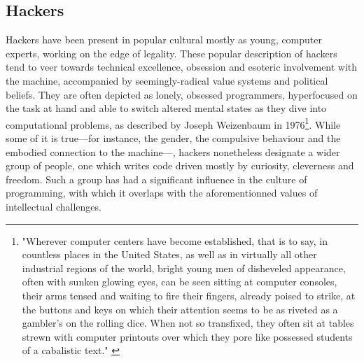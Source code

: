 \subsection{Hackers}
\label{subsec:hackers}

Hackers have been present in popular cultural mostly as young, computer experts, working on the edge of legality. These popular description of hackers tend to veer towards technical excellence, obsession and esoteric involvement with the machine, accompanied by seemingly-radical value systems and political beliefs. They are often depicted as lonely, obsessed programmers, hyperfocused on the task at hand and able to switch altered mental states as they dive into computational problems, as described by Joseph Weizenbaum in 1976\footnote{"Wherever computer centers have become established, that is to say, in countless places in the United States, as well as in virtually all other industrial regions of the world, bright young men of disheveled appearance, often with sunken glowing eyes, can be seen sitting at computer consoles, their arms tensed and waiting to fire their fingers, already poised to strike, at the buttons and keys on which their attention seems to be as riveted as a gambler's on the rolling dice. When not so transfixed, they often sit at tables strewn with computer printouts over which they pore like possessed students of a cabalistic text." \citep{weizenbaum_computer_1976}}. While some of it is true—for instance, the gender, the compulsive behaviour and the embodied connection to the machine—, hackers nonetheless designate a wider group of people, one which writes code driven mostly by curiosity, cleverness and freedom. Such a group has had a significant influence in the culture of programming, with which it overlaps with the aforementionned values of intellectual challenges.

